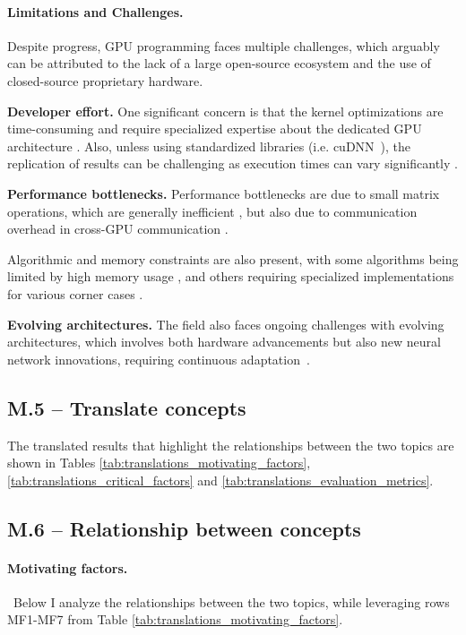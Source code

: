 \paragraph{Limitations and Challenges.}
Despite progress, GPU programming faces multiple challenges, which arguably can be attributed to
the lack of a large open-source ecosystem and the use of closed-source proprietary hardware.

\textbf{Developer effort.}
One significant concern is that the kernel optimizations are time-consuming and require specialized
expertise about the dedicated GPU architecture . Also, unless using standardized
libraries (i.e. cuDNN~\cite{chetlur_cudnn_2014}), the replication of results can be challenging as
execution times can vary significantly .

\textbf{Performance bottlenecks.}
Performance bottlenecks are due to small matrix operations, which are generally inefficient ,
but also due to communication overhead in cross-GPU communication .

Algorithmic and memory constraints are also present, with some algorithms being limited by high
memory usage , and others requiring specialized implementations for various corner
cases .

\textbf{Evolving architectures.}
The field also faces ongoing challenges with evolving architectures, which involves both hardware advancements
but also new neural network innovations, requiring continuous adaptation~.

\subsection{M.5 -- Translate concepts}
The translated results that highlight the relationships between the two topics are shown in Tables
\ref{tab:translations_motivating_factors}, \ref{tab:translations_critical_factors} and
\ref{tab:translations_evaluation_metrics}.

\subsection{M.6 -- Relationship between concepts}

\paragraph{Motivating factors.}\
Below I analyze the relationships between the two topics, while leveraging rows MF1-MF7 from Table
\ref{tab:translations_motivating_factors}.

